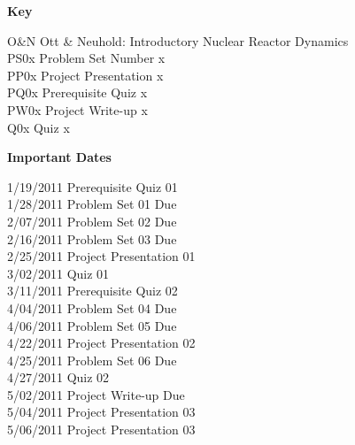 \textbf{Key}

\begin{minipage}{5in}\begin{flushleft}
O\&N \hfill Ott \& Neuhold: Introductory Nuclear Reactor Dynamics\\
PS0x \hfill Problem Set Number x \\
PP0x \hfill Project Presentation x\\
PQ0x \hfill Prerequisite Quiz x\\
PW0x \hfill Project Write-up x\\
Q0x  \hfill Quiz x
\end{flushleft}\end{minipage}

\textbf{Important Dates}

\begin{minipage}{5in}\begin{flushleft}
1/19/2011 \hfill Prerequisite Quiz 01\\
1/28/2011 \hfill Problem Set 01 Due\\
2/07/2011 \hfill Problem Set 02 Due\\
2/16/2011 \hfill Problem Set 03 Due\\
2/25/2011 \hfill Project Presentation 01 \\
3/02/2011 \hfill Quiz 01\\
3/11/2011 \hfill Prerequisite Quiz 02\\
4/04/2011 \hfill Problem Set 04 Due\\
4/06/2011 \hfill Problem Set 05 Due\\
4/22/2011 \hfill Project Presentation 02\\
4/25/2011 \hfill Problem Set 06 Due\\
4/27/2011 \hfill Quiz 02\\
5/02/2011 \hfill Project Write-up Due\\
5/04/2011 \hfill Project Presentation 03\\
5/06/2011 \hfill Project Presentation 03\\
\end{flushleft}\end{minipage}

